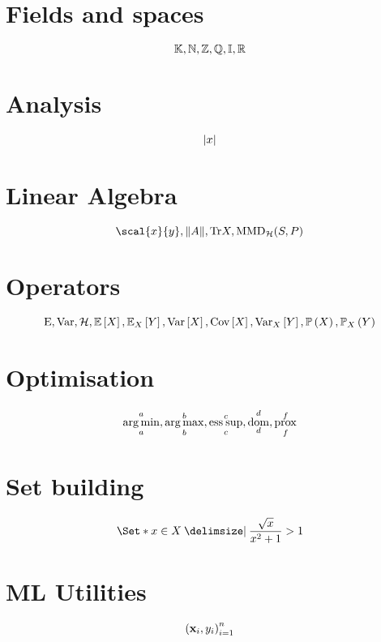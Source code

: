 \documentclass{article}
\begin{document}
\section{Fields and spaces}
\[
  \K, \N, \Z, \Q, \I, \R
\]

\section{Analysis}
\[
  \abs{x}
\]

\section{Linear Algebra}
\[
  \scal{x}{y}, \norm{A}, \tr X, \MMD{\mathcal{H}}{S}{P}
\]

\section{Operators}
\[
  \E, \V, \mc{H}, \Expect{X}, \Expects{X}{Y}, \Var{X}, \Cov{X}, \Vars{X}{Y}, \Prob{X}, \Probs{X}{Y}
\]

\section{Optimisation}
\[
  \argmin_{a}^{a}, \argmax_{b}^{b}, \essup_{c}^{c}, \dom_{d}^{d}, \prox_{f}^{f}
\]

\section{Set building}
\[
  \Set*{ x \in X \given \frac{\sqrt{x}}{x^2+1} > 1 }
\]

\section{ML Utilities}
\[
  \generaldataset
\]
\end{document}
